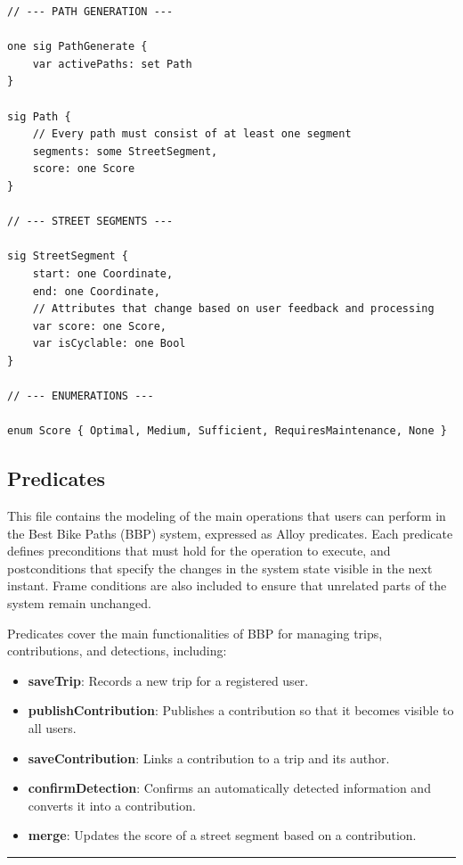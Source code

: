 \begin{lstlisting}[language=alloy, caption={Alloy Signatures}, label={lst:signatures}]
// --- PATH GENERATION ---

one sig PathGenerate {
    var activePaths: set Path
}

sig Path {
    // Every path must consist of at least one segment
    segments: some StreetSegment,
    score: one Score
}

// --- STREET SEGMENTS ---

sig StreetSegment {
    start: one Coordinate,
    end: one Coordinate,
    // Attributes that change based on user feedback and processing
    var score: one Score,
    var isCyclable: one Bool
}

// --- ENUMERATIONS ---

enum Score { Optimal, Medium, Sufficient, RequiresMaintenance, None }
\end{lstlisting}

\subsection{Predicates}

This file contains the modeling of the main operations that users can perform in the Best Bike Paths (BBP) system, expressed as Alloy predicates. Each predicate defines preconditions that must hold for the operation to execute, and postconditions that specify the changes in the system state visible in the next instant. Frame conditions are also included to ensure that unrelated parts of the system remain unchanged.

Predicates cover the main functionalities of BBP for managing trips, contributions, and detections, including:
\begin{itemize}
    \item \textbf{saveTrip}: Records a new trip for a registered user.
    \item \textbf{publishContribution}: Publishes a contribution so that it becomes visible to all users.
    \item \textbf{saveContribution}: Links a contribution to a trip and its author.
    \item \textbf{confirmDetection}: Confirms an automatically detected information and converts it into a contribution.
    \item \textbf{merge}: Updates the score of a street segment based on a contribution.
\end{itemize}

\noindent\rule{\linewidth}{0.4pt} %


